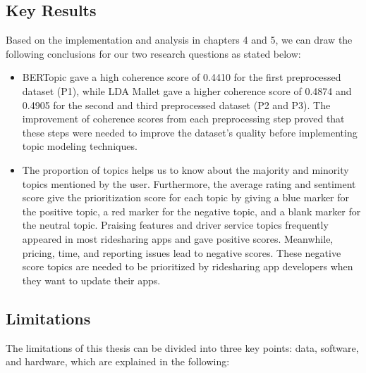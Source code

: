 \documentclass[12pt]{article}
\begin{document}
\subsection{Key Results}
Based on the implementation and analysis in chapters 4 and 5, we can draw the following conclusions for our two research questions as stated below:

\begin{itemize}
    \item BERTopic gave a high coherence score of 0.4410 for the first preprocessed dataset (P1), while LDA Mallet gave a higher coherence score of 0.4874 and 0.4905 for the second and third preprocessed dataset (P2 and P3). The improvement of coherence scores from each preprocessing step proved that these steps were needed to improve the dataset's quality before implementing topic modeling techniques.
    \item The proportion of topics helps us to know about the majority and minority topics mentioned by the user. Furthermore, the average rating and sentiment score give the prioritization score for each topic by giving a blue marker for the positive topic, a red marker for the negative topic, and a blank marker for the neutral topic. Praising features and driver service topics frequently appeared in most ridesharing apps and gave positive scores. Meanwhile, pricing, time, and reporting issues lead to negative scores. These negative score topics are needed to be prioritized by ridesharing app developers when they want to update their apps.
\end{itemize}

\subsection{Limitations}
The limitations of this thesis can be divided into three key points: data, software, and hardware, which are explained in the following:
\end{document}
